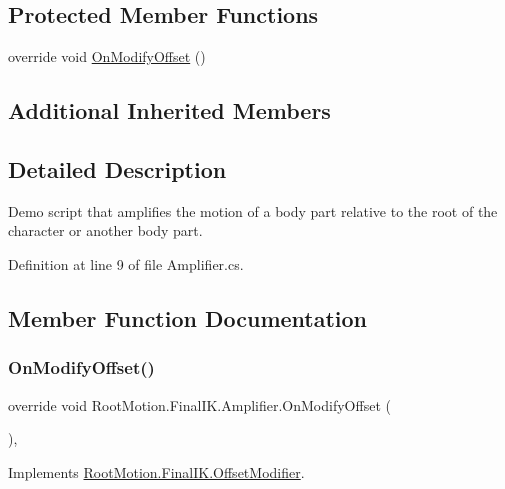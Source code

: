 \subsection*{Protected Member Functions}
\begin{DoxyCompactItemize}
\item 
override void \mbox{\hyperlink{class_root_motion_1_1_final_i_k_1_1_amplifier_ae715d956bcc0f79218cef49659e6f2fb}{On\+Modify\+Offset}} ()
\end{DoxyCompactItemize}
\subsection*{Additional Inherited Members}


\subsection{Detailed Description}
Demo script that amplifies the motion of a body part relative to the root of the character or another body part. 



Definition at line 9 of file Amplifier.\+cs.



\subsection{Member Function Documentation}
\mbox{\label{class_root_motion_1_1_final_i_k_1_1_amplifier_ae715d956bcc0f79218cef49659e6f2fb}} 
\subsubsection{\texorpdfstring{On\+Modify\+Offset()}{OnModifyOffset()}}
{\footnotesize\ttfamily override void Root\+Motion.\+Final\+I\+K.\+Amplifier.\+On\+Modify\+Offset (\begin{DoxyParamCaption}{ }\end{DoxyParamCaption})\hspace{0.3cm}{\ttfamily [protected]}, {\ttfamily [virtual]}}



Implements \mbox{\hyperlink{class_root_motion_1_1_final_i_k_1_1_offset_modifier_a777e9ffb4afca3d8647959a79a1120bb}{Root\+Motion.\+Final\+I\+K.\+Offset\+Modifier}}.



